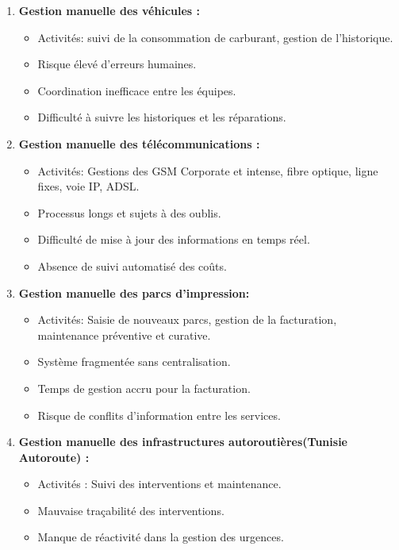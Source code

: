 \documentclass[a4paper,11pt]{report}
\begin{document}
\begin{enumerate}

\item \textbf{Gestion manuelle des véhicules : } 
\begin{itemize}
	\item Activités: suivi de la consommation de carburant, gestion de l'historique.
	\item Risque élevé d'erreurs humaines.
	\item Coordination inefficace entre les équipes.
	\item Difficulté à suivre les historiques et les réparations. \\
	 \newline

\end{itemize}

\item \textbf{Gestion manuelle des télécommunications :} 
\begin{itemize}
	\item Activités: Gestions des GSM Corporate et intense, fibre optique, ligne fixes, voie IP, ADSL.
	\item Processus longs et sujets à des oublis.
	\item Difficulté de mise à jour des informations en temps réel.
	\item Absence de suivi automatisé des coûts.	 
\end{itemize}

\item \textbf{Gestion manuelle des parcs d'impression:}
\begin{itemize}
	\item Activités: Saisie de nouveaux parcs, gestion de la facturation, maintenance préventive et curative.
	\item Système fragmentée sans centralisation.
	\item Temps de gestion accru pour la facturation.
	\item Risque de conflits d'information entre les services.
\end{itemize}

\item \textbf{Gestion manuelle des infrastructures autoroutières(Tunisie Autoroute) : } \nopagebreak[4]

\begin{itemize}
	\item Activités : Suivi des interventions et maintenance.
	\item Mauvaise traçabilité des interventions.
	\item Manque de réactivité dans la gestion des urgences.
\end{itemize}


\end{enumerate}
\end{document}
